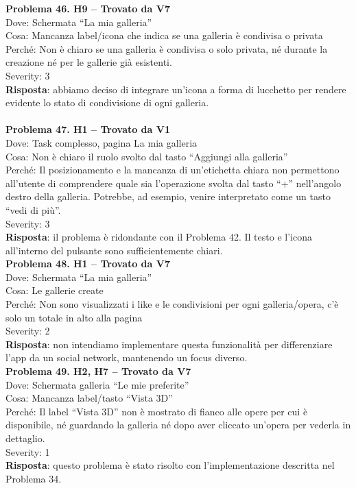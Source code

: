 \documentclass{article}
\begin{document}
\noindent \textbf{Problema 46. H9 – Trovato da V7} \\
Dove: Schermata “La mia galleria” \\
Cosa: Mancanza label/icona che indica se una galleria è condivisa o privata \\
Perché: Non è chiaro se una galleria è condivisa o solo privata, né durante la creazione né per le gallerie già esistenti. \\
Severity: 3 \\
\textbf{Risposta}: abbiamo deciso di integrare un’icona a forma di lucchetto per rendere evidente lo stato di condivisione di ogni galleria.\\ \\

\noindent \textbf{Problema 47. H1 – Trovato da V1} \\
Dove: Task complesso, pagina La mia galleria \\
Cosa: Non è chiaro il ruolo svolto dal tasto “Aggiungi alla galleria” \\
Perché: Il posizionamento e la mancanza di un’etichetta chiara non permettono all’utente di comprendere quale sia l’operazione svolta dal tasto “+” nell’angolo destro della galleria. Potrebbe, ad esempio, venire interpretato come un tasto “vedi di più”. \\
Severity: 3 \\
\textbf{Risposta}: il problema è ridondante con il Problema 42. Il testo e l’icona all’interno del pulsante sono sufficientemente chiari.\\

\noindent \textbf{Problema 48. H1 – Trovato da V7} \\
Dove: Schermata “La mia galleria” \\
Cosa: Le gallerie create \\
Perché: Non sono visualizzati i like e le condivisioni per ogni galleria/opera, c’è solo un totale in alto alla pagina \\
Severity: 2 \\
\textbf{Risposta}: non intendiamo implementare questa funzionalità per differenziare l’app da un social network, mantenendo un focus diverso.\\

\noindent \textbf{Problema 49. H2, H7 – Trovato da V7} \\
Dove: Schermata galleria “Le mie preferite” \\
Cosa: Mancanza label/tasto “Vista 3D” \\
Perché: Il label “Vista 3D” non è mostrato di fianco alle opere per cui è disponibile, né guardando la galleria né dopo aver cliccato un’opera per vederla in dettaglio. \\
Severity: 1 \\
\textbf{Risposta}: questo problema è stato risolto con l’implementazione descritta nel Problema 34.\\
\end{document}

